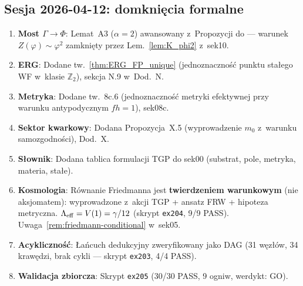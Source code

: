 \subsection*{Sesja 2026-04-12: domkni\k{e}cia formalne}

\begin{remark}
\label{rem:session-20260412}
\begin{enumerate}[nosep]
  \item \textbf{Most $\Gamma \to \Phi$}: Lemat~A3 ($\alpha = 2$) awansowany
    z~Propozycji do  ---
    warunek $Z(\varphi) \sim \varphi^2$ zamkni\k{e}ty przez
    Lem.~\ref{lem:K_phi2} z~sek10.

  \item \textbf{ERG}: Dodane tw.~\ref{thm:ERG_FP_unique}
    (jednoznaczno\'s\'c punktu sta\l{}ego WF w~klasie $\mathbb{Z}_2$),
    sekcja N.9 w~Dod.~N.

  \item \textbf{Metryka}: Dodane tw.~8c.6 (jednoznaczno\'s\'c metryki
    efektywnej przy warunku antypodycznym $fh = 1$), sek08c.

  \item \textbf{Sektor kwarkowy}: Dodana Propozycja~X.5
    (wyprowadzenie $m_0$ z~warunku samozgodno\'sci), Dod.~X.

  \item \textbf{S\l{}ownik}: Dodana tablica formulacji TGP
    do sek00 (substrat, pole, metryka, materia, sta\l{}e).

  \item \textbf{Kosmologia}: R\'ownanie Friedmanna jest
    \textbf{twierdzeniem warunkowym} (nie aksjomatem):
    wyprowadzone z~akcji TGP + ansatz FRW + hipoteza metryczna.
    $\Lambda_{\rm eff} = V(1) = \gamma/12$
    (skrypt \texttt{ex204}, 9/9 PASS).
    Uwaga~\ref{rem:friedmann-conditional} w~sek05.

  \item \textbf{Acykliczno\'s\'c}: \L{}a\'ncuch dedukcyjny
    zweryfikowany jako DAG (31 w\k{e}z\l{}\'ow, 34 kraw\k{e}dzi,
    brak cykli --- skrypt \texttt{ex203}, 4/4 PASS).

  \item \textbf{Walidacja zbiorcza}: Skrypt \texttt{ex205}
    (30/30 PASS, 9 ogniw, werdykt: GO).


\end{enumerate}
\end{remark}
